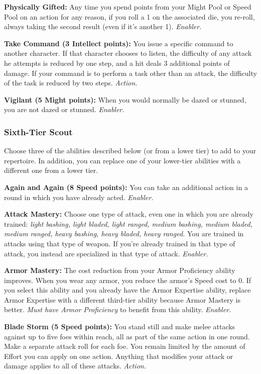 \documentclass[a4paper,10pt,final,twocolumn,oneside]{book}
\newcommand{\itemAbility}[2]{\textcolor{25gray}{\textbullet\textbf{ #1:}}{ #2}\par}
\newcommand{\enabler}{\textit{ Enabler.}}
\newcommand{\action}{\textit{ Action.}}
\begin{document}
\itemAbility{Physically Gifted}{Any time you spend points from your Might Pool or Speed Pool on an action for any reason, if you roll a 1 on the associated die, you re-roll, always taking the second result (even if it’s another 1).\enabler}

\itemAbility{Take Command (3 Intellect points)}{You issue a specific command to another character. If that character chooses to listen, the difficulty of any attack he attempts is reduced by one step, and a hit deals 3 additional points of damage. If your command is to perform a task other than an attack, the difficulty of the task is reduced by two steps.\action}

\itemAbility{Vigilant (5 Might points)}{When you would normally be dazed or stunned, you are not dazed or stunned.\enabler}


\subsubsection*{Sixth-Tier Scout}
\label{subsub:scoutSixthTier}

Choose three of the abilities described
below (or from a lower tier) to add to your
repertoire. In addition, you can replace one
of your lower-tier abilities with a different
one from a lower tier.

\itemAbility{Again and Again (8 Speed points)}{You can take an additional action in a round in which you have already acted.\enabler}

\itemAbility{Attack Mastery}{Choose one type of attack, even one in which you are already trained: \textit{light bashing, light bladed, light ranged, medium bashing, medium bladed, medium ranged, heavy bashing, heavy bladed, heavy ranged.} You are trained in attacks using that type of weapon. If you’re already trained in that type of attack, you instead are specialized in that type of attack.\enabler}

\itemAbility{Armor Mastery}{The cost reduction from your Armor Proficiency ability improves. When you wear any armor, you reduce the armor’s Speed cost to 0. If you select this ability and you already have the Armor Expertise ability, replace Armor Expertise with a different third-tier ability because Armor Mastery is better. \textit{Must have Armor Proficiency} to benefit from this ability.\enabler}

\itemAbility{Blade Storm (5 Speed points)}{You stand still and make melee attacks against up to five foes within reach, all as part of the same action in one round. Make a separate attack roll for each foe. You remain limited by the amount of Effort you can apply on one action. Anything that modifies your attack or damage applies to all of these attacks.\action}
\end{document}
